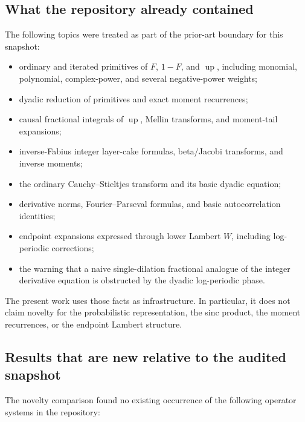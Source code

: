 \documentclass[11pt,oneside]{article}
\theoremstyle{definition}
\theoremstyle{remark}
\newcommand{\Up}{\operatorname{up}}
\newcommand{\1}{\mathbf 1}
\begin{document}
\subsection{What the repository already contained}

The following topics were treated as part of the prior-art boundary for this
snapshot:

\begin{itemize}
\item ordinary and iterated primitives of $F$, $1-F$, and $\Up$, including
      monomial, polynomial, complex-power, and several negative-power
      weights;
\item dyadic reduction of primitives and exact moment recurrences;
\item causal fractional integrals of $\Up$, Mellin transforms, and moment-tail
      expansions;
\item inverse-Fabius integer layer-cake formulas, beta/Jacobi transforms, and
      inverse moments;
\item the ordinary Cauchy--Stieltjes transform and its basic dyadic equation;
\item derivative norms, Fourier--Parseval formulas, and basic
      autocorrelation identities;
\item endpoint expansions expressed through lower Lambert $W$, including
      log-periodic corrections;
\item the warning that a naive single-dilation fractional analogue of the
      integer derivative equation is obstructed by the dyadic log-periodic
      phase.
\end{itemize}

The present work uses those facts as infrastructure.  In particular, it does
not claim novelty for the probabilistic representation, the sinc product, the
moment recurrences, or the endpoint Lambert structure.

\subsection{Results that are new relative to the audited snapshot}

The novelty comparison found no existing occurrence of the following
operator systems in the repository:
\end{document}
